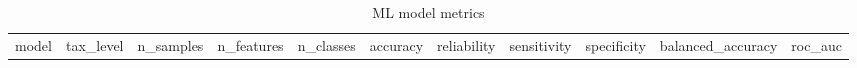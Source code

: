 \documentclass[
  letterpaper,
  DIV=11,
  numbers=noendperiod]{scrartcl}
\begin{document}
\begin{longtable}[]{@{}
  >{\raggedright\arraybackslash}p{}
  >{\raggedright\arraybackslash}p{}
  >{\raggedleft\arraybackslash}p{}
  >{\raggedleft\arraybackslash}p{}
  >{\raggedleft\arraybackslash}p{}
  >{\raggedleft\arraybackslash}p{}
  >{\raggedright\arraybackslash}p{}
  >{\raggedleft\arraybackslash}p{}
  >{\raggedleft\arraybackslash}p{}
  >{\raggedleft\arraybackslash}p{}
  >{\raggedleft\arraybackslash}p{}@{}}
\caption{ML model metrics}\tabularnewline
\toprule\noalign{}
\begin{minipage}[b]{\linewidth}\raggedright
model
\end{minipage} & \begin{minipage}[b]{\linewidth}\raggedright
tax\_level
\end{minipage} & \begin{minipage}[b]{\linewidth}\raggedleft
n\_samples
\end{minipage} & \begin{minipage}[b]{\linewidth}\raggedleft
n\_features
\end{minipage} & \begin{minipage}[b]{\linewidth}\raggedleft
n\_classes
\end{minipage} & \begin{minipage}[b]{\linewidth}\raggedleft
accuracy
\end{minipage} & \begin{minipage}[b]{\linewidth}\raggedright
reliability
\end{minipage} & \begin{minipage}[b]{\linewidth}\raggedleft
sensitivity
\end{minipage} & \begin{minipage}[b]{\linewidth}\raggedleft
specificity
\end{minipage} & \begin{minipage}[b]{\linewidth}\raggedleft
balanced\_accuracy
\end{minipage} & \begin{minipage}[b]{\linewidth}\raggedleft
roc\_auc

\end{minipage}
\end{longtable}
\end{document}
